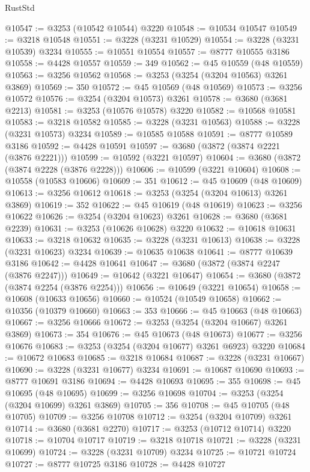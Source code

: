 \begin{lexlean}{RustStd}
\begin{coremodule}
@10547 := @3253 (@10542 @10544) @3220
@10548 := @10534 @10547
@10549 := @3218 @10548
@10551 := @3228 (@3231 @10529)
@10554 := @3228 (@3231 @10539) @3234
@10555 := @10551 @10554
@10557 := @8777 @10555 @3186
@10558 := @4428 @10557
@10559 := 349
@10562 := @45 @10559 (@48 @10559)
@10563 := @3256 @10562
@10568 := @3253 (@3254 (@3204 @10563) @3261 @3869)
@10569 := 350
@10572 := @45 @10569 (@48 @10569)
@10573 := @3256 @10572
@10576 := @3254 (@3204 @10573) @3261
@10578 := @3680 (@3681 @2213)
@10581 := @3253 (@10576 @10578) @3220
@10582 := @10568 @10581
@10583 := @3218 @10582
@10585 := @3228 (@3231 @10563)
@10588 := @3228 (@3231 @10573) @3234
@10589 := @10585 @10588
@10591 := @8777 @10589 @3186
@10592 := @4428 @10591
@10597 := @3680 (@3872 (@3874 @2221 (@3876 @2221)))
@10599 := @10592 (@3221 @10597)
@10604 := @3680 (@3872 (@3874 @2228 (@3876 @2228)))
@10606 := @10599 (@3221 @10604)
@10608 := @10558 (@10583 @10606)
@10609 := 351
@10612 := @45 @10609 (@48 @10609)
@10613 := @3256 @10612
@10618 := @3253 (@3254 (@3204 @10613) @3261 @3869)
@10619 := 352
@10622 := @45 @10619 (@48 @10619)
@10623 := @3256 @10622
@10626 := @3254 (@3204 @10623) @3261
@10628 := @3680 (@3681 @2239)
@10631 := @3253 (@10626 @10628) @3220
@10632 := @10618 @10631
@10633 := @3218 @10632
@10635 := @3228 (@3231 @10613)
@10638 := @3228 (@3231 @10623) @3234
@10639 := @10635 @10638
@10641 := @8777 @10639 @3186
@10642 := @4428 @10641
@10647 := @3680 (@3872 (@3874 @2247 (@3876 @2247)))
@10649 := @10642 (@3221 @10647)
@10654 := @3680 (@3872 (@3874 @2254 (@3876 @2254)))
@10656 := @10649 (@3221 @10654)
@10658 := @10608 (@10633 @10656)
@10660 := @10524 (@10549 @10658)
@10662 := @10356 (@10379 @10660)
@10663 := 353
@10666 := @45 @10663 (@48 @10663)
@10667 := @3256 @10666
@10672 := @3253 (@3254 (@3204 @10667) @3261 @3869)
@10673 := 354
@10676 := @45 @10673 (@48 @10673)
@10677 := @3256 @10676
@10683 := @3253 (@3254 (@3204 @10677) @3261 @6923) @3220
@10684 := @10672 @10683
@10685 := @3218 @10684
@10687 := @3228 (@3231 @10667)
@10690 := @3228 (@3231 @10677) @3234
@10691 := @10687 @10690
@10693 := @8777 @10691 @3186
@10694 := @4428 @10693
@10695 := 355
@10698 := @45 @10695 (@48 @10695)
@10699 := @3256 @10698
@10704 := @3253 (@3254 (@3204 @10699) @3261 @3869)
@10705 := 356
@10708 := @45 @10705 (@48 @10705)
@10709 := @3256 @10708
@10712 := @3254 (@3204 @10709) @3261
@10714 := @3680 (@3681 @2270)
@10717 := @3253 (@10712 @10714) @3220
@10718 := @10704 @10717
@10719 := @3218 @10718
@10721 := @3228 (@3231 @10699)
@10724 := @3228 (@3231 @10709) @3234
@10725 := @10721 @10724
@10727 := @8777 @10725 @3186
@10728 := @4428 @10727

\end{coremodule}
\end{lexlean}
